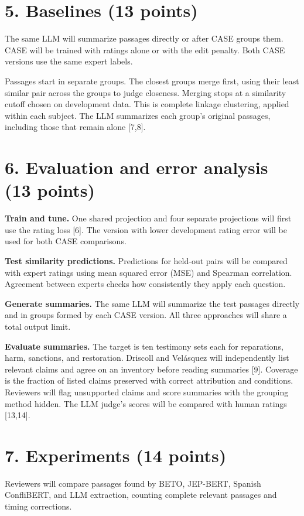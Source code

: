 \documentclass[11pt,letterpaper]{article}
\begin{document}
\section{5. Baselines (13 points)}
The same LLM will summarize passages directly or after CASE groups them. CASE will be trained with ratings alone or with the edit penalty. Both CASE versions use the same expert labels.

Passages start in separate groups. The closest groups merge first, using their least similar pair across the groups to judge closeness. Merging stops at a similarity cutoff chosen on development data. This is complete linkage clustering, applied within each subject. The LLM summarizes each group's original passages, including those that remain alone [7,8].

\section{6. Evaluation and error analysis (13 points)}
\textbf{Train and tune.} One shared projection and four separate projections will first use the rating loss [6]. The version with lower development rating error will be used for both CASE comparisons.

\textbf{Test similarity predictions.} Predictions for held-out pairs will be compared with expert ratings using mean squared error (MSE) and Spearman correlation. Agreement between experts checks how consistently they apply each question.

\textbf{Generate summaries.} The same LLM will summarize the test passages directly and in groups formed by each CASE version. All three approaches will share a total output limit.

\textbf{Evaluate summaries.} The target is ten testimony sets each for reparations, harm, sanctions, and restoration. Driscoll and Vel\'asquez will independently list relevant claims and agree on an inventory before reading summaries [9]. Coverage is the fraction of listed claims preserved with correct attribution and conditions. Reviewers will flag unsupported claims and score summaries with the grouping method hidden. The LLM judge's scores will be compared with human ratings [13,14].

\section{7. Experiments (14 points)}
Reviewers will compare passages found by BETO, JEP-BERT, Spanish ConfliBERT, and LLM extraction, counting complete relevant passages and timing corrections.
\end{document}
